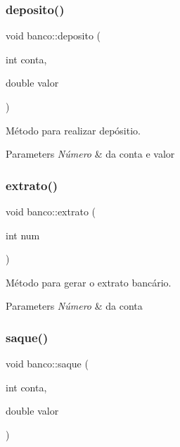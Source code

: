 \subsubsection{\texorpdfstring{deposito()}{deposito()}}
{\footnotesize\ttfamily void banco\+::deposito (\begin{DoxyParamCaption}\item[{int}]{conta,  }\item[{double}]{valor }\end{DoxyParamCaption})}



Método para realizar depósitio. 


\begin{DoxyParams}{Parameters}
{\em Número} & da conta e valor \\
\hline
\end{DoxyParams}
\mbox{\label{classbanco_ab13b225a8005a75a31f2c2938b9869e1}} 
\subsubsection{\texorpdfstring{extrato()}{extrato()}}
{\footnotesize\ttfamily void banco\+::extrato (\begin{DoxyParamCaption}\item[{int}]{num }\end{DoxyParamCaption})}



Método para gerar o extrato bancário. 


\begin{DoxyParams}{Parameters}
{\em Número} & da conta \\
\hline
\end{DoxyParams}
\mbox{\label{classbanco_a9ae918d40986ad66ba6b06874dd51ceb}} 
\subsubsection{\texorpdfstring{saque()}{saque()}}
{\footnotesize\ttfamily void banco\+::saque (\begin{DoxyParamCaption}\item[{int}]{conta,  }\item[{double}]{valor }\end{DoxyParamCaption})}



